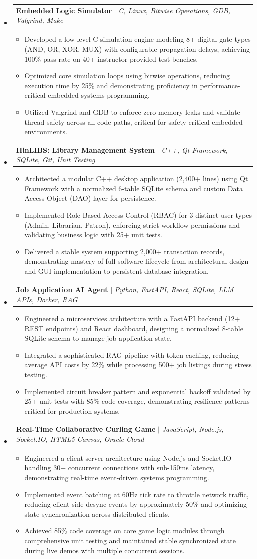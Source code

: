\documentclass[letterpaper,11pt]{article}
\makeatletter
\newcommand{\resumeItem}[1]{
  \item\small{
    {#1 \vspace{-2pt}}
  }
}
\newcommand{\resumeProjectHeading}[2]{
    \item
    \begin{tabular*}{0.97\textwidth}{l@{\extracolsep{\fill}}r}
      \small#1 & #2 \\
    \end{tabular*}\vspace{-7pt}
}
\newcommand{\resumeSubHeadingListStart}{\begin{itemize}[leftmargin=0.15in, label={}]}
\newcommand{\resumeSubHeadingListEnd}{\end{itemize}}
\newcommand{\resumeItemListStart}{\begin{itemize}}
\newcommand{\resumeItemListEnd}{\end{itemize}\vspace{-5pt}}
\makeatother
\begin{document}
\resumeSubHeadingListStart
\resumeProjectHeading{\textbf{Embedded Logic Simulator} $|$ \emph{C, Linux, Bitwise Operations, GDB, Valgrind, Make}}{} \n \resumeItemListStart \n \resumeItem{Developed a low-level C simulation engine modeling 8+ digital gate types (AND, OR, XOR, MUX) with configurable propagation delays, achieving 100\% pass rate on 40+ instructor-provided test benches.} \n \resumeItem{Optimized core simulation loops using bitwise operations, reducing execution time by 25\% and demonstrating proficiency in performance-critical embedded systems programming.} \n \resumeItem{Utilized Valgrind and GDB to enforce zero memory leaks and validate thread safety across all code paths, critical for safety-critical embedded environments.} \n \resumeItemListEnd \n \n \resumeProjectHeading{\textbf{HinLIBS: Library Management System} $|$ \emph{C++, Qt Framework, SQLite, Git, Unit Testing}}{} \n \resumeItemListStart \n \resumeItem{Architected a modular C++ desktop application (2,400+ lines) using Qt Framework with a normalized 6-table SQLite schema and custom Data Access Object (DAO) layer for persistence.} \n \resumeItem{Implemented Role-Based Access Control (RBAC) for 3 distinct user types (Admin, Librarian, Patron), enforcing strict workflow permissions and validating business logic with 25+ unit tests.} \n \resumeItem{Delivered a stable system supporting 2,000+ transaction records, demonstrating mastery of full software lifecycle from architectural design and GUI implementation to persistent database integration.} \n \resumeItemListEnd \n \n \resumeProjectHeading{\textbf{Job Application AI Agent} $|$ \emph{Python, FastAPI, React, SQLite, LLM APIs, Docker, RAG}}{} \n \resumeItemListStart \n \resumeItem{Engineered a microservices architecture with a FastAPI backend (12+ REST endpoints) and React dashboard, designing a normalized 8-table SQLite schema to manage job application state.} \n \resumeItem{Integrated a sophisticated RAG pipeline with token caching, reducing average API costs by 22\% while processing 500+ job listings during stress testing.} \n \resumeItem{Implemented circuit breaker pattern and exponential backoff validated by 25+ unit tests with 85\% code coverage, demonstrating resilience patterns critical for production systems.} \n \resumeItemListEnd \n \n \resumeProjectHeading{\textbf{Real-Time Collaborative Curling Game} $|$ \emph{JavaScript, Node.js, Socket.IO, HTML5 Canvas, Oracle Cloud}}{} \n \resumeItemListStart \n \resumeItem{Engineered a client-server architecture using Node.js and Socket.IO handling 30+ concurrent connections with sub-150ms latency, demonstrating real-time event-driven systems programming.} \n \resumeItem{Implemented event batching at 60Hz tick rate to throttle network traffic, reducing client-side desync events by approximately 50\% and optimizing state synchronization across distributed clients.} \n \resumeItem{Achieved 85\% code coverage on core game logic modules through comprehensive unit testing and maintained stable synchronized state during live demos with multiple concurrent sessions.} \n \resumeItemListEnd
\resumeSubHeadingListEnd
\end{document}
